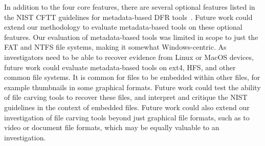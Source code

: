 In addition to the four core features, there are several optional features listed in the NIST CFTT guidelines for metadata-based DFR tools~\cite{meta:dfr:standards}.
Future work could extend our methodology to evaluate metadata-based tools on these optional features.
Our evaluation of metadata-based tools was limited in scope to just the FAT and NTFS file systems, making it somewhat Windows-centric.
As investigators need to be able to recover evidence from Linux or MacOS devices, future work could evaluate metadata-based tools on ext4, HFS, and other common file systems.
It is common for files to be embedded within other files, for example thumbnails in some graphical formats.
Future work could test the ability of file carving tools to recover these files, and interpret and critique the NIST guidelines in the context of embedded files.
Future work could also extend our investigation of file carving tools beyond just graphical file formats, such as to video or document file formats, which may be equally valuable to an investigation.
